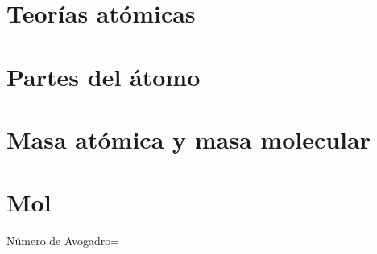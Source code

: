 


\section{Teorías atómicas}



\section{Partes del átomo}



\section{Masa atómica y masa molecular}



\section{Mol}

Número de Avogadro=



\putbib